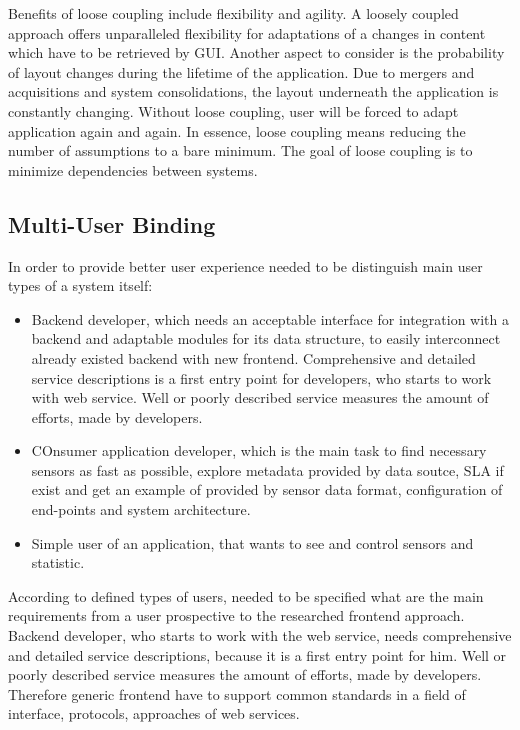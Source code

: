 	Benefits of loose coupling include flexibility and agility. A loosely coupled approach offers unparalleled flexibility for adaptations of a changes in content which have to be retrieved by GUI. Another aspect to consider is the probability of layout changes during the lifetime of the application. Due to mergers and acquisitions and system consolidations, the layout underneath the application is constantly changing. Without loose coupling, user will be forced to adapt application again and again. In essence, loose coupling means reducing the number of assumptions to a bare minimum. The goal of loose coupling is to minimize dependencies between systems. 

\subsection {Multi-User Binding}
	In order to provide better user experience needed to be distinguish main user types of a system itself:
	\begin{itemize}
	\item Backend developer, which needs an acceptable interface for integration with a backend and adaptable modules for its data structure, to easily interconnect already existed backend with new frontend. Comprehensive and detailed service descriptions is a first entry point for developers, who starts to work with web service. Well or poorly described service measures the amount of efforts, made by developers.
	\item COnsumer application developer, which is the main task to find necessary sensors as fast as possible, explore metadata provided by data soutce, SLA if exist and get an example of provided by sensor data format, configuration of end-points and system architecture.
	\item Simple user of an application, that wants to see and control sensors and statistic.
	\end{itemize}
	According to defined types of users, needed to be specified what are the main requirements from a user prospective to the researched frontend approach.
	\newline 
	Backend developer, who starts to work with the web service, needs comprehensive and detailed service descriptions, because it is a first entry point for him. Well or poorly described service measures the amount of efforts, made by developers. Therefore generic frontend have to support common standards in a field of interface, protocols, approaches of web services.
	\newline
